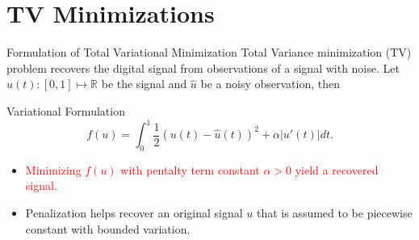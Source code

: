 \documentclass[11pt]{beamer}
\theoremstyle{definition}
\begin{document}
\section{TV Minimizations}
    \begin{frame}{Formulation of Total Variational Minimization}
        Total Variance minimization (TV) problem recovers the digital signal from observations of a signal with noise. 
        Let $u(t):[0, 1]\mapsto \mathbb R$ be the signal and $\hat u$ be a noisy observation, then
        \begin{block}{Variational Formulation}
            \[
                f(u) = \int_0^1 \frac{1}{2} 
                (u(t) - \hat u(t))^2 + \alpha |u'(t)|dt. 
            \]    
        \end{block}
        \begin{itemize}
            \item \textcolor{red}{Minimizing $f(u)$ with pentalty term constant $\alpha > 0$ yield a recovered signal. }
            \item Penalization helps recover an original signal $u$ that is assumed to be piecewise constant with bounded variation. 
        \end{itemize}
    \end{frame}
\end{document}
